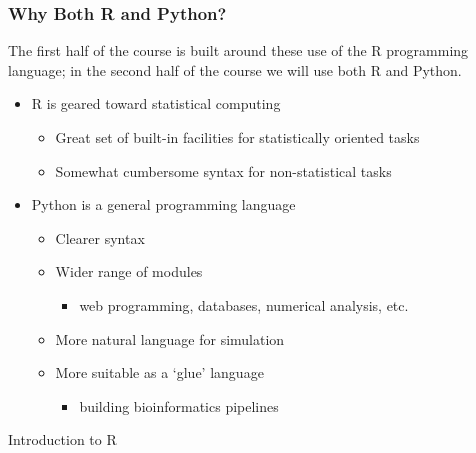 \documentclass{beamer}
\begin{document}
\begin{frame}
  \frametitle{Why Both R and Python?}

The first half of the course is built around these use of the R programming language; in the second half of the course we will use both R and Python.

\begin{itemize}

\item R is geared toward statistical computing
\begin{itemize}
	\item Great set of built-in facilities for statistically oriented tasks
	\item Somewhat cumbersome syntax for non-statistical tasks
\end{itemize}

\item Python is a general programming language
\begin{itemize}
	\item Clearer syntax
 \item Wider range of modules
		\begin{itemize}
			\item web programming, databases, numerical analysis, etc.
		\end{itemize}
	\item More natural language for simulation
	\item More suitable as a `glue' language
		\begin{itemize}
			\item building bioinformatics pipelines
		\end{itemize}
\end{itemize}

\end{itemize}

\end{frame}


\begin{frame}

\begin{center}
\LARGE{Introduction to R}
\end{center}

\end{frame}
\end{document}
